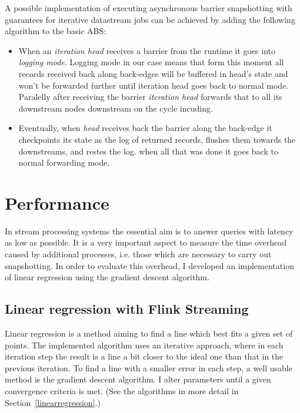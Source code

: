 A possible implementation of executing asynchronous barrier snapshotting with guarantees for iterative datastream jobs can be achieved by adding the following algorithm to the basic ABS:
\begin{itemize}
\item When an \textit{iteration head} receives a barrier from the runtime it goes into \textit{logging mode}. Logging mode in our case means that form this moment all records received back along back-edges will be buffered in head's state and won't be forwarded further until iteration head goes back to normal mode.
Paralelly after receiving the barrier \textit{iteration head} forwards that to all its downstream nodes downstream on the cycle incuding.
\item Eventually, when \textit{head} receives back the barrier along the back-edge it checkpoints its state as the log of returned records, flushes them towards the downstreams, and restes the log. when all that was done it goes back to normal forwarding mode. 

\end{itemize}

\cite{pull}



\section{Performance}
In stream processing systems the essential aim is to answer queries with latency as low as possible. It is a very important aspect to measure the time overhead caused by  additional processes, i.e. those which are necessary to carry out snapshotting. In order to evaluate this overhead, I developed an implementation of linear regression using the gradient descent
algorithm.

\subsection{Linear regression with Flink Streaming}
Linear regression is a method aiming to find a line which best fits a given set of points. The implemented algorithm uses an iterative approach, where in each iteration step the result is a line a bit closer to the ideal one than that in the previous iteration. To find a line with a smaller error in each step, a well usable method is the gradient descent algorithm. I alter parameters until a given convergence criteria is met. (See the algorithms in more detail in Section~\ref{linearregression}.)

